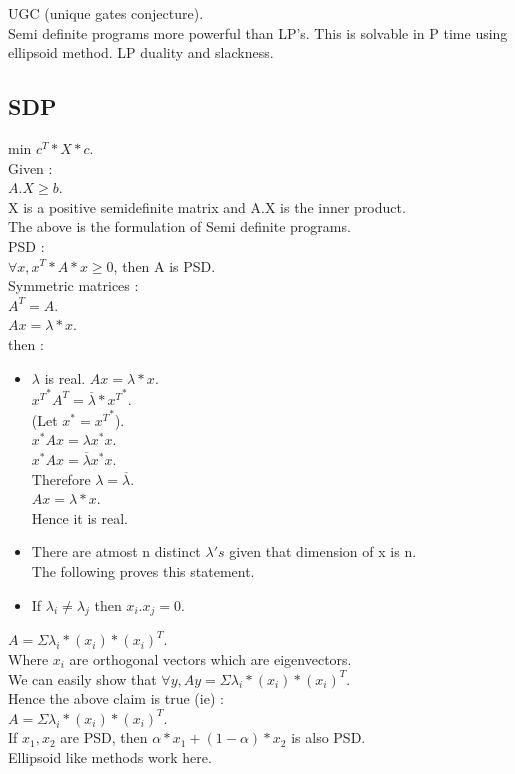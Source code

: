 \documentclass[solution,addpoints,12pt]{exam}
\begin{document}
UGC (unique gates conjecture).\\
Semi definite programs more powerful than LP's.
This is solvable in P time using ellipsoid method.
LP duality and slackness.\\
\subsection{SDP}
min $c^T*X*c$.\\
Given :\\
$A.X \ge b$.\\
X is a positive semidefinite matrix and A.X is the inner product.\\
The above is the formulation of  Semi definite programs.\\


PSD :\\
$\forall x, x^T*A*x \ge 0$, then A is PSD.\\
Symmetric matrices :\\
$A^T = A$.\\
$Ax = \lambda*x$.\\
then :
\begin{itemize}
\item $\lambda$ is real.
$Ax = \lambda*x$.\\
${x^T}^* A^T = \overline{\lambda}*{x^T}^*$.\\
(Let $x^* = {x^T}^*$).\\
$x^* A x = \lambda x^* x$.\\
$x^* A x = \overline{\lambda} x^* x$.\\
Therefore $\lambda = \overline{\lambda}$.\\$Ax = \lambda*x$.\\
Hence it is real.\\
\item There are atmost n distinct $\lambda's$ given that dimension of x is n.\\
The following proves this statement.
\item If $\lambda_i \ne \lambda_j$ then $x_i.x_j = 0$.
\end{itemize}

$A = \Sigma \lambda_i*(x_i)*{(x_i)}^T$.\\
Where $x_i$ are orthogonal vectors which are eigenvectors.\\
We can easily show that
$\forall y, Ay = \Sigma \lambda_i*(x_i)*{(x_i)}^T$.\\
Hence the above claim is true (ie) :\\
$A = \Sigma \lambda_i*(x_i)*{(x_i)}^T$.\\

If $x_1, x_2$ are PSD, then $\alpha*x_1 + (1 - \alpha)*x_2$ is also PSD.\\
Ellipsoid like methods work here.\\
\end{document}
